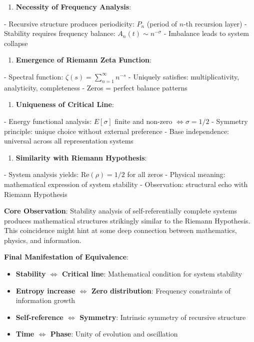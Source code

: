 \begin{enumerate}
\item \textbf{Necessity of Frequency Analysis}:
\end{enumerate}
   - Recursive structure produces periodicity: $P_n$ (period of $n$-th recursion layer)
   - Stability requires frequency balance: $A_n(t) \sim n^{-\sigma}$
   - Imbalance leads to system collapse

\begin{enumerate}
\item \textbf{Emergence of Riemann Zeta Function}:
\end{enumerate}
   - Spectral function: $\zeta(s) = \sum_{n=1}^{\infty} n^{-s}$
   - Uniquely satisfies: multiplicativity, analyticity, completeness
   - Zeros = perfect balance patterns

\begin{enumerate}
\item \textbf{Uniqueness of Critical Line}:
\end{enumerate}
   - Energy functional analysis: $E[\sigma]$ finite and non-zero $\Leftrightarrow \sigma = 1/2$
   - Symmetry principle: unique choice without external preference
   - Base independence: universal across all representation systems

\begin{enumerate}
\item \textbf{Similarity with Riemann Hypothesis}:
\end{enumerate}
   - System analysis yields: $\text{Re}(\rho) = 1/2$ for all zeros
   - Physical meaning: mathematical expression of system stability
   - Observation: structural echo with Riemann Hypothesis

\textbf{Core Observation}:
Stability analysis of self-referentially complete systems produces mathematical structures strikingly similar to the Riemann Hypothesis.
This coincidence might hint at some deep connection between mathematics, physics, and information.

\textbf{Final Manifestation of Equivalence}:
\begin{itemize}
\item \textbf{Stability $\Leftrightarrow$ Critical line}: Mathematical condition for system stability
\item \textbf{Entropy increase $\Leftrightarrow$ Zero distribution}: Frequency constraints of information growth
\item \textbf{Self-reference $\Leftrightarrow$ Symmetry}: Intrinsic symmetry of recursive structure
\item \textbf{Time $\Leftrightarrow$ Phase}: Unity of evolution and oscillation
\end{itemize}

